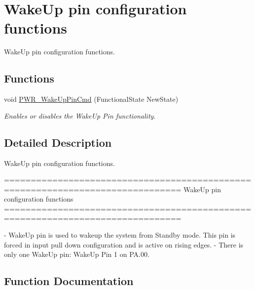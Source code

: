 \hypertarget{group___p_w_r___group3}{}\section{Wake\+Up pin configuration functions}
\label{group___p_w_r___group3}


Wake\+Up pin configuration functions.  


\subsection*{Functions}
\begin{DoxyCompactItemize}
\item 
void \hyperlink{group___p_w_r___group3_gae5fd6f9336ef8c60d5483651cb0d1a00}{P\+W\+R\+\_\+\+Wake\+Up\+Pin\+Cmd} (Functional\+State New\+State)
\begin{DoxyCompactList}\small\item\em Enables or disables the Wake\+Up Pin functionality. \end{DoxyCompactList}\end{DoxyCompactItemize}


\subsection{Detailed Description}
Wake\+Up pin configuration functions. 

\begin{DoxyVerb} ===============================================================================
                    WakeUp pin configuration functions
 ===============================================================================  

 - WakeUp pin is used to wakeup the system from Standby mode. This pin is 
   forced in input pull down configuration and is active on rising edges.
 - There is only one WakeUp pin: WakeUp Pin 1 on PA.00.\end{DoxyVerb}
 

\subsection{Function Documentation}
\hypertarget{group___p_w_r___group3_gae5fd6f9336ef8c60d5483651cb0d1a00}{}

